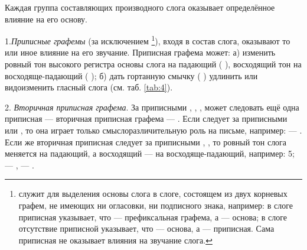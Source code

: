 Каждая группа составляющих производного слога оказывает определённое влияние на его основу.

1.\emph{Приписные графемы} (за исключением \footnote[11]{ служит для выделения основы слога в слоге, состоящем из двух корневых графем, не имеющих ни огласовки, ни подписного знака, например: в слоге  приписная  указывает, что  --- префиксальная графема, а  --- основа; в слоге  отсутствие приписной  указывает, что  --- основа, а  --- приписная. Сама приписная не оказывает влияния на звучание слога.}), входя в состав слога, оказывают то или иное влияние на его звучание. Приписная графема может: а) изменить ровный тон высокого регистра основы слога на падающий
(  \toneN ), восходящий тон на восходяще-падающий (  \toneVN ); б) дать гортанную смычку ( \toneG ) удлинить или видоизменить гласный слога (см. таб. \ref{tab:4}).

2. \emph{Вторичная приписная графема}. За приписными , , ,  может следовать ещё одна приписная --- вторичная приписная графема --- . Если  следует за приписными  или , то она играет только смыслоразличительную роль на письме, например:  --- . Если же вторичная приписная следует за приписными , , то ровный тон слога меняется на падающий, а восходящий --- на восходяще-падающий, например:  5;  ---  , --- .

